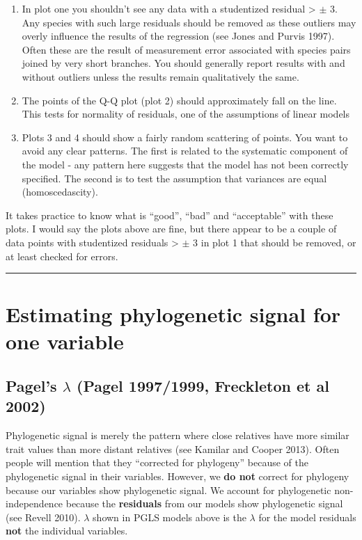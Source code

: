 \documentclass[]{book}
\providecommand{\tightlist}{%
  \setlength{\itemsep}{0pt}\setlength{\parskip}{0pt}}
\begin{document}
\begin{enumerate}
\def\labelenumi{\arabic{enumi}.}
\tightlist
\item
  In plot one you shouldn't see any data with a studentized residual
  \textgreater{} \(\pm\) 3. Any species with such large residuals should
  be removed as these outliers may overly influence the results of the
  regression (see Jones and Purvis 1997). Often these are the result of
  measurement error associated with species pairs joined by very short
  branches. You should generally report results with and without
  outliers unless the results remain qualitatively the same.
\item
  The points of the Q-Q plot (plot 2) should approximately fall on the
  line. This tests for normality of residuals, one of the assumptions of
  linear models
\item
  Plots 3 and 4 should show a fairly random scattering of points. You
  want to avoid any clear patterns. The first is related to the
  systematic component of the model - any pattern here suggests that the
  model has not been correctly specified. The second is to test the
  assumption that variances are equal (homoscedascity).
\end{enumerate}

It takes practice to know what is ``good'', ``bad'' and ``acceptable''
with these plots. I would say the plots above are fine, but there appear
to be a couple of data points with studentized residuals \textgreater{}
\(\pm\) 3 in plot 1 that should be removed, or at least checked for
errors.

\begin{center}\rule{0.5\linewidth}{\linethickness}\end{center}

\section{Estimating phylogenetic signal for one
variable}\label{estimating-phylogenetic-signal-for-one-variable}

\subsection{\texorpdfstring{Pagel's \(\lambda\) (Pagel 1997/1999,
Freckleton et al
2002)}{Pagel's \textbackslash{}lambda (Pagel 1997/1999, Freckleton et al 2002)}}\label{pagels-lambda-pagel-19971999-freckleton-et-al-2002}

Phylogenetic signal is merely the pattern where close relatives have
more similar trait values than more distant relatives (see Kamilar and
Cooper 2013). Often people will mention that they ``corrected for
phylogeny'' because of the phylogenetic signal in their variables.
However, we \textbf{do not} correct for phylogeny because our variables
show phylogenetic signal. We account for phylogenetic non-independence
because the \textbf{residuals} from our models show phylogenetic signal
(see Revell 2010). \(\lambda\) shown in PGLS models above is the
\(\lambda\) for the model residuals \textbf{not} the individual
variables.
\end{document}
